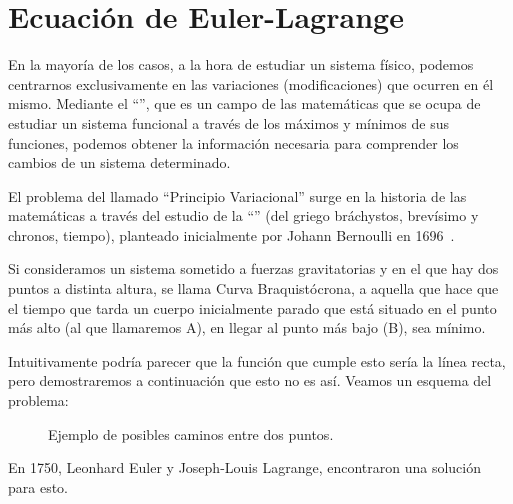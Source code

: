 \section{Ecuación de Euler-Lagrange}\label{sec:ecuacion-de-euler-lagrange}
En la mayoría de los casos, a la hora de estudiar un sistema físico, podemos centrarnos exclusivamente en las variaciones (modificaciones) que ocurren en él mismo. Mediante el ``'', que es un campo de las matemáticas que se ocupa de estudiar un sistema funcional a través de los máximos y mínimos de sus funciones, podemos obtener la información necesaria para comprender los cambios de un sistema determinado.

El problema del llamado ``Principio Variacional'' surge en la historia de las matemáticas a través del estudio de la ``'' (del griego bráchystos, brevísimo y chronos, tiempo), planteado inicialmente por Johann Bernoulli en 1696~\cite{AE}.

Si consideramos un sistema sometido a fuerzas gravitatorias y en el que hay dos puntos a distinta altura, se llama Curva Braquistócrona, a aquella que hace que el tiempo que tarda un cuerpo inicialmente parado que está situado en el punto más alto (al que llamaremos A), en llegar al punto más bajo (B), sea mínimo.

Intuitivamente podría parecer que la función que cumple esto sería la línea recta, pero demostraremos a continuación que esto no es así. Veamos un esquema del problema:

\begin{figure}[H]
	\centering
	\caption{Ejemplo de posibles caminos entre dos puntos.}\label{pic:braquistocrona}
\end{figure}

En 1750, Leonhard Euler y Joseph-Louis Lagrange, encontraron una solución para esto.

